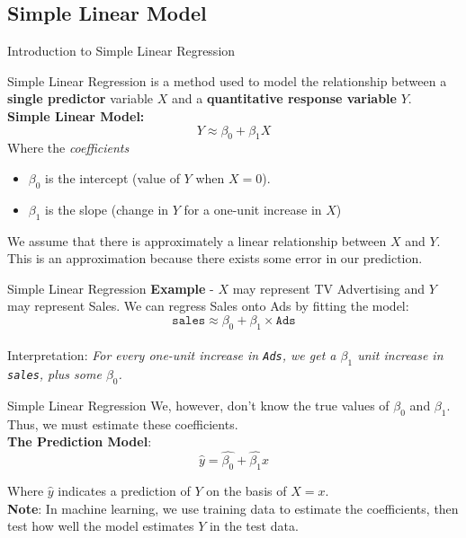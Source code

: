 \documentclass[aspectratio=169,xcolor=dvipsnames]{beamer}
\begin{document}
\subsection{Simple Linear Model}
\begin{frame}{Introduction to Simple Linear Regression}

Simple Linear Regression is a method used to model the relationship between a \textbf{single predictor} variable $X$ and a \textbf{quantitative response variable} $Y$. \\
\bigskip
\textbf{Simple Linear Model:}
{\Large \begin{equation}\label{eq:test}
 Y \approx \beta_0 + \beta_1X
\end{equation}}
Where the \textit{coefficients}
\begin{itemize}
	\item $\beta_0$ is the intercept (value of $Y$ when $X=0$).
	\item $\beta_1$ is the slope (change in $Y$ for a one-unit increase in $X$)
\end{itemize}
\vspace{0.5cm}
We assume that there is approximately a linear relationship between $X$ and $Y$. This is an approximation because there exists some error in our prediction.
\end{frame}
\begin{frame}{Simple Linear Regression}
\textbf{Example} -  $X$ may represent TV Advertising and $Y$ may represent Sales. We can regress Sales onto Ads by fitting the model:\\
{\Large $$ \texttt{sales} \approx \beta_0 + \beta_1 \times \texttt{Ads} $$} \\
\vspace{0.5cm}
Interpretation: \textit{For every one-unit increase in \texttt{Ads}, we get a $\beta_1$ unit increase in \texttt{sales}, plus some $\beta_0$.}

\end{frame}
\begin{frame}{Simple Linear Regression}
We, however, don't know the true values of $\beta_0$ and $\beta_1$. Thus, we must estimate these coefficients. \\
\bigskip
\textbf{The Prediction Model}:
{\Large\begin{equation}
\hat{y} = \hat{\beta_0} + \hat{\beta_1}x
\end{equation}}
\bigskip

Where $\hat{y}$ indicates a prediction of $Y$ on the basis of $X = x$. \\ 
\bigskip
\textbf{Note}: In machine learning, we use training data to estimate the coefficients, then test how well the model estimates $Y$ in the test data.

\end{frame}
\end{document}
